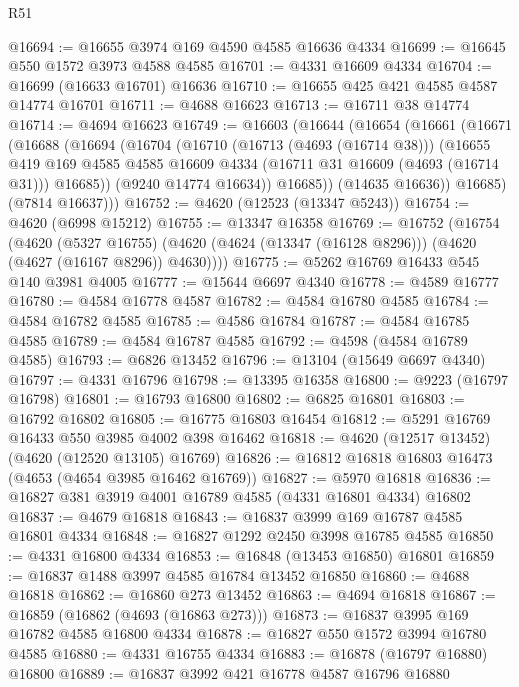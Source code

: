 \begin{lexlean}{R51}
\begin{coremodule}
@16694 := @16655 @3974 @169 @4590 @4585 @16636 @4334
@16699 := @16645 @550 @1572 @3973 @4588 @4585
@16701 := @4331 @16609 @4334
@16704 := @16699 (@16633 @16701) @16636
@16710 := @16655 @425 @421 @4585 @4587 @14774 @16701
@16711 := @4688 @16623
@16713 := @16711 @38 @14774
@16714 := @4694 @16623
@16749 := @16603
    (@16644
      (@16654
        (@16661
          (@16671
            (@16688
              (@16694
                (@16704
                  (@16710
                    (@16713 (@4693 (@16714 @38)))
                    (@16655
                      @419
                      @169
                      @4585
                      @4585
                      @16609
                      @4334
                      (@16711 @31 @16609 (@4693 (@16714 @31)))
                      @16685))
                  (@9240 @14774 @16634))
                @16685))
            (@14635 @16636))
          @16685)
        (@7814 @16637)))
@16752 := @4620 (@12523 (@13347 @5243))
@16754 := @4620 (@6998 @15212)
@16755 := @13347 @16358
@16769 := @16752
    (@16754
      (@4620
        (@5327 @16755)
        (@4620 (@4624 (@13347 (@16128 @8296))) (@4620 (@4627 (@16167 @8296)) @4630))))
@16775 := @5262 @16769 @16433 @545 @140 @3981 @4005
@16777 := @15644 @6697 @4340
@16778 := @4589 @16777
@16780 := @4584 @16778 @4587
@16782 := @4584 @16780 @4585
@16784 := @4584 @16782 @4585
@16785 := @4586 @16784
@16787 := @4584 @16785 @4585
@16789 := @4584 @16787 @4585
@16792 := @4598 (@4584 @16789 @4585)
@16793 := @6826 @13452
@16796 := @13104 (@15649 @6697 @4340)
@16797 := @4331 @16796
@16798 := @13395 @16358
@16800 := @9223 (@16797 @16798)
@16801 := @16793 @16800
@16802 := @6825 @16801
@16803 := @16792 @16802
@16805 := @16775 @16803 @16454
@16812 := @5291 @16769 @16433 @550 @3985 @4002 @398 @16462
@16818 := @4620 (@12517 @13452) (@4620 (@12520 @13105) @16769)
@16826 := @16812 @16818 @16803 @16473 (@4653 (@4654 @3985 @16462 @16769))
@16827 := @5970 @16818
@16836 := @16827 @381 @3919 @4001 @16789 @4585 (@4331 @16801 @4334) @16802
@16837 := @4679 @16818
@16843 := @16837 @3999 @169 @16787 @4585 @16801 @4334
@16848 := @16827 @1292 @2450 @3998 @16785 @4585
@16850 := @4331 @16800 @4334
@16853 := @16848 (@13453 @16850) @16801
@16859 := @16837 @1488 @3997 @4585 @16784 @13452 @16850
@16860 := @4688 @16818
@16862 := @16860 @273 @13452
@16863 := @4694 @16818
@16867 := @16859 (@16862 (@4693 (@16863 @273)))
@16873 := @16837 @3995 @169 @16782 @4585 @16800 @4334
@16878 := @16827 @550 @1572 @3994 @16780 @4585
@16880 := @4331 @16755 @4334
@16883 := @16878 (@16797 @16880) @16800
@16889 := @16837 @3992 @421 @16778 @4587 @16796 @16880

\end{coremodule}
\end{lexlean}
